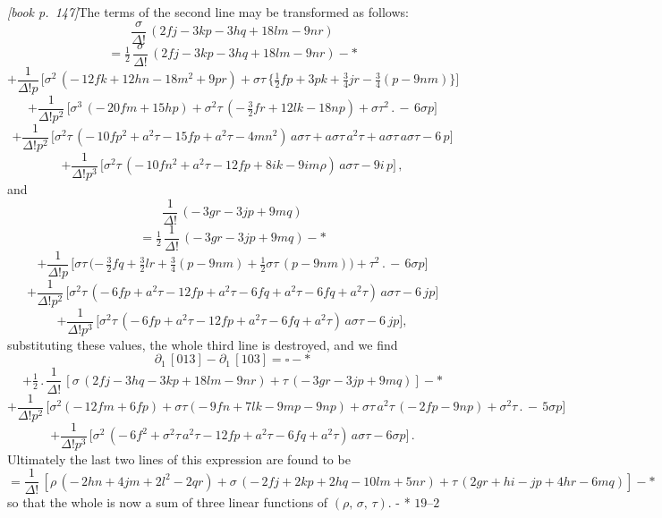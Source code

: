 \documentclass[11pt,a4paper]{article}
\theoremstyle{plain}
\theoremstyle{definition}
\theoremstyle{remark}
\begin{document}
\medskip\noindent\textit{[book p.~147]}\quad The terms of the second line may be transformed as follows:
\[
\frac{\sigma}{\Delta!}\,(2fj - 3kp - 3hq + 18lm - 9nr)
\]
\[
= \tfrac{1}{2}\,\frac{\sigma}{\Delta!}\,(2fj - 3kp - 3hq + 18lm - 9nr) - *
\]
\[
+ \frac{1}{\Delta!p}\,\bigl[\sigma^{2}\,(-\,12fk + 12hn - 18m^{2} + 9pr) + \sigma\tau\,\bigl\{\tfrac{1}{2}fp + 3pk + \tfrac{3}{4}jr - \tfrac{3}{4}(p - 9nm)\bigr\}\bigr]
\]
\[
+ \frac{1}{\Delta!p^{2}}\,\bigl[\sigma^{3}\,(-\,20fm + 15hp) + \sigma^{2}\tau\,(-\,\tfrac{3}{2}fr + 12lk - 18np) + \sigma\tau^{2}\,.\,-\,6\sigma p\bigr]
\]
\[
+ \frac{1}{\Delta!p^{2}}\,\bigl[\sigma^{2}\tau\,(-\,10fp^{2} + a^{2}\tau - 15fp + a^{2}\tau - 4mn^{2})\,a\sigma\tau + a\sigma\tau\,a^{2}\tau + a\sigma\tau\,a\sigma\tau - 6\,p\bigr]
\]
\[
+ \frac{1}{\Delta!p^{3}}\,\bigl[\sigma^{2}\tau\,(-\,10f n^{2} + a^{2}\tau - 12 f p + 8 i k - 9 i m\rho)\,a\sigma\tau - 9 i\,p\bigr]\,,
\]
and
\[
\frac{1}{\Delta!}\,(-\,3gr - 3jp + 9mq)
\]
\[
= \tfrac{1}{2}\,\frac{1}{\Delta!}\,(-\,3gr - 3jp + 9mq) - *
\]
\[
+ \frac{1}{\Delta!p}\,\bigl[\sigma\tau\,(-\,\tfrac{3}{2}fq + \tfrac{3}{2}lr + \tfrac{3}{4}(p - 9nm) + \tfrac{1}{2}\sigma\tau\,(p - 9nm)\bigr) + \tau^{2}\,.\,-\,6\sigma p\bigr]
\]
\[
+ \frac{1}{\Delta!p^{2}}\,\bigl[\sigma^{2}\tau\,(-\,6fp + a^{2}\tau - 12fp + a^{2}\tau - 6fq + a^{2}\tau - 6fq + a^{2}\tau)\,a\sigma\tau - 6\,jp\bigr]
\]
\[
+ \frac{1}{\Delta!p^{3}}\,\bigl[\sigma^{2}\tau\,(-\,6fp + a^{2}\tau - 12fp + a^{2}\tau - 6fq + a^{2}\tau)\,a\sigma\tau - 6\,jp\bigr],
\]
substituting these values, the whole third line is destroyed, and we find
\[
\partial_1\,[013] - \partial_1\,[103] = \square - *
\]
\[
+ \tfrac{1}{2}\,.\,\frac{1}{\Delta!}\,[\sigma\,(2fj - 3hq - 3kp + 18lm - 9nr) + \tau\,(-\,3gr - 3jp + 9mq)] - *
\]
\[
+ \frac{1}{\Delta!p^{2}}\,\bigl[\sigma^{2}(-\,12fm + 6fp) + \sigma\tau(-\,9fn + 7lk - 9mp - 9np) + \sigma\tau\,a^{2}\tau\,(-\,2fp - 9np) + \sigma^{2}\tau\,.\,-\,5\sigma p\bigr]
\]
\[
+ \frac{1}{\Delta!p^{3}}\,\bigl[\sigma^{2}\,(-\,6f^{2} + \sigma^{2}\tau\,a^{2}\tau - 12fp + a^{2}\tau - 6fq + a^{2}\tau)\,a\sigma\tau - 6\sigma p\bigr]\,.
\]
Ultimately the last two lines of this expression are found to be
\[
= \frac{1}{\Delta!}\,[\rho\,(-\,2hn + 4jm + 2l^{2} - 2qr) + \sigma\,(-\,2fj + 2kp + 2hq - 10lm + 5nr) + \tau\,(2gr + hi - jp + 4hr - 6mq)] - *
\]
so that the whole is now a sum of three linear functions of $(\rho,\,\sigma,\,\tau)$. - *
\hfill $19$--$2$
\end{document}
